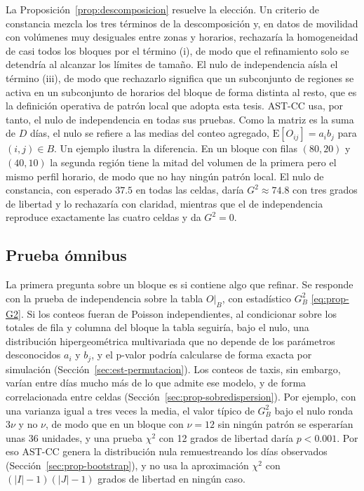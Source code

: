 La Proposición~\ref{prop:descomposicion} resuelve la elección. Un criterio de
constancia mezcla los tres términos de la descomposición y, en datos de
movilidad con volúmenes muy desiguales entre zonas y horarios, rechazaría la
homogeneidad de casi todos los bloques por el término (i), de modo que el
refinamiento solo se detendría al alcanzar los límites de tamaño. El nulo de
independencia aísla el término (iii), de modo que rechazarlo significa que un subconjunto de
regiones se activa en un subconjunto de horarios del bloque de forma distinta
al resto, que es la definición operativa de patrón local que adopta esta
tesis. AST-CC usa, por tanto, el nulo de independencia en todas sus pruebas.
Como la matriz es la suma de $D$ días, el nulo se refiere a las medias del
conteo agregado, $\mathrm{E}[O_{ij}] = a_i b_j$ para $(i,j)\in B$. Un ejemplo
ilustra la diferencia. En un bloque con filas $(80,20)$ y $(40,10)$ la segunda
región tiene la mitad del volumen de la primera pero el mismo perfil horario, de
modo que no hay ningún patrón local. El nulo de constancia, con esperado $37.5$ en
todas las celdas, daría $G^2\approx 74.8$ con tres grados de libertad y lo
rechazaría con claridad, mientras que el de independencia reproduce exactamente
las cuatro celdas y da $G^2 = 0$.

\subsection{Prueba ómnibus}

La primera pregunta sobre un bloque es si contiene algo que refinar. Se
responde con la prueba de independencia sobre la tabla $O|_B$, con estadístico
$G^2_B$ \eqref{eq:prop-G2}. Si los conteos fueran de Poisson independientes, al
condicionar sobre los totales de fila y columna del bloque la tabla seguiría,
bajo el nulo, una distribución hipergeométrica multivariada que no depende de
los parámetros desconocidos $a_i$ y $b_j$, y el p-valor podría calcularse de
forma exacta por simulación (Sección~\ref{sec:est-permutacion}). Los conteos de
taxis, sin embargo, varían entre días mucho más de lo que admite ese modelo, y
de forma correlacionada entre celdas (Sección~\ref{sec:prop-sobredispersion}).
Por ejemplo, con una varianza igual a tres veces la media, el valor típico de
$G^2_B$ bajo el nulo ronda $3\nu$ y no $\nu$, de modo que en un bloque con
$\nu=12$ sin ningún patrón se esperarían unas 36 unidades, y una prueba $\chi^2$
con 12 grados de libertad daría $p<0.001$. Por eso AST-CC genera la distribución
nula remuestreando los días observados (Sección~\ref{sec:prop-bootstrap}), y no usa
la aproximación $\chi^2$ con $(|I|-1)(|J|-1)$ grados de libertad en ningún caso.

